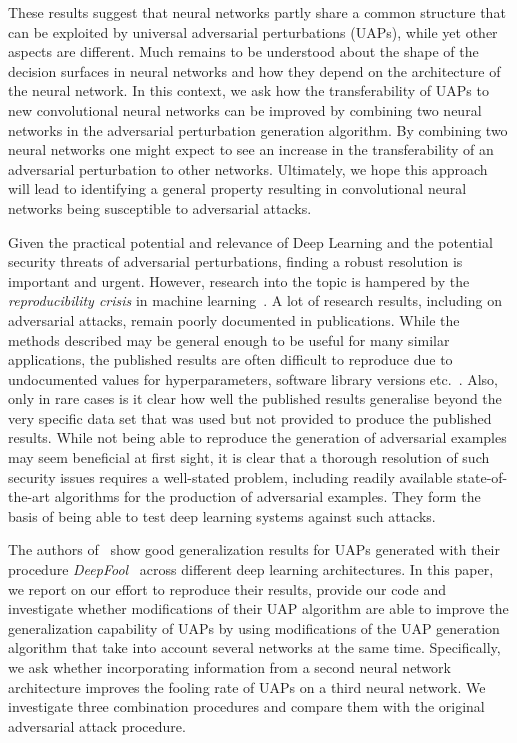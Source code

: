 \documentclass[runningheads]{llncs}
\begin{document}
These results suggest that neural networks partly share a common structure that can be exploited by universal adversarial perturbations (UAPs), while yet other aspects are different. Much remains to be understood about the shape of the decision surfaces in neural networks and how they depend on the architecture of the neural network. In this context, we ask how the transferability of UAPs to new convolutional neural networks can be improved by combining two neural networks in the adversarial perturbation generation algorithm. By combining two neural networks one might expect to see an increase in the transferability of an adversarial perturbation to other networks. Ultimately, we hope this approach will lead to identifying a general property resulting in convolutional neural networks being susceptible to adversarial attacks.

Given the practical potential and relevance of Deep Learning and the potential security threats of adversarial perturbations, finding a robust resolution is important and urgent. However, research into the topic is hampered by the \emph{reproducibility crisis} in machine learning~\cite{raff2020quantifying}. A lot of research results, including on adversarial attacks, remain poorly documented in publications. While the methods described may be general enough to be useful for many similar applications, 
the published results are often difficult to reproduce due to undocumented values for hyperparameters, software library versions etc.~\cite{Gundersen2018StateOT}. %
Also, only in rare cases is it clear how well the published results generalise beyond the very specific data set that was used but not provided to produce the published results. While not being able to reproduce the generation of adversarial examples may seem beneficial at first sight, it is clear that a thorough resolution of such security issues requires a well-stated problem, including readily available state-of-the-art algorithms for the production of adversarial examples. They form the basis of being able to test deep learning systems against such attacks. 

The authors of~\cite{moosavidezfooli_universal_2017,moosavi-dezfooli_deepfool_2016} show good generalization results for UAPs generated with their procedure \emph{DeepFool}~\cite{moosavi-dezfooli_deepfool_2016} across different deep learning architectures. 
In this paper, we report on our effort to reproduce their results, provide our code and investigate whether modifications of their UAP algorithm are able to improve the generalization capability of UAPs by using modifications of the UAP generation algorithm that take into account several networks at the same time. Specifically, we ask whether incorporating information from a second neural network architecture improves the fooling rate of UAPs on a third neural network. We investigate three combination procedures and compare them with the original adversarial attack procedure.
\end{document}
